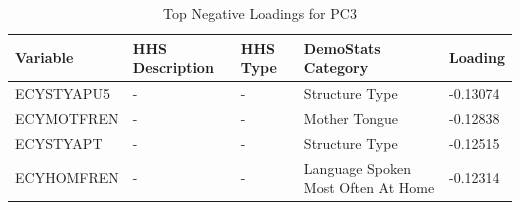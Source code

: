 \documentclass{article}
\begin{document}
\begin{table}[H]
\centering
\caption{Top Negative Loadings for PC3}
\label{tab:pc3_neg}
\begin{tabular}{@{}lllll@{}}
\toprule
Variable & HHS Description & HHS Type & DemoStats Category & Loading \\
\midrule
ECYSTYAPU5 & - & - & Structure Type & -0.13074 \\
ECYMOTFREN & - & - & Mother Tongue & -0.12838 \\
ECYSTYAPT & - & - & Structure Type & -0.12515 \\
ECYHOMFREN & - & - & Language Spoken Most Often At Home & -0.12314 \\
\bottomrule
\end{tabular}
\end{table}
\end{document}
